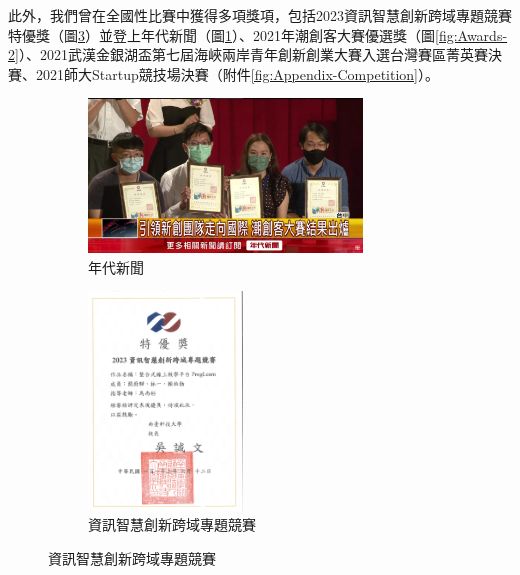 此外，我們曾在全國性比賽中獲得多項獎項，包括2023資訊智慧創新跨域專題競賽特優獎（圖\ref{fig:Awards-1}）並登上年代新聞（圖\ref{fig:News}）、2021年潮創客大賽優選獎（圖\ref{fig:Awards-2}）、2021武漢金銀湖盃第七屆海峽兩岸青年創新創業大賽入選台灣賽區菁英賽決賽、2021師大Startup競技場決賽（附件\ref{fig:Appendix-Competition}）。

\begin{figure}[H]
  \centering
  \begin{subfigure}{0.32\linewidth}
    \centering
    \includegraphics[width=0.8\textwidth]{images/年代新聞.jpg}
    \caption{年代新聞}
    \label{fig:News}
  \end{subfigure}
    \begin{subfigure}{0.31\linewidth}
    \centering
    \includegraphics[width=0.45\textwidth]{images/ProgLearn.jpg}
    \caption{資訊智慧創新跨域專題競賽}
    \label{fig:Awards-1}
  \end{subfigure}

\end{figure}
